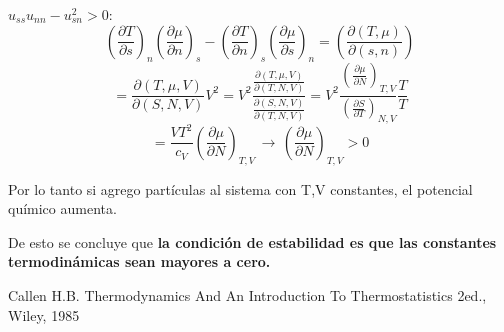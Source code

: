 \documentclass[10pt,twocolumn]{IEEEtran2e}
\begin{document}
$u_{ss} u_{nn}-u^{2}_{sn} > 0$:
\begin{equation}
 \left(\frac{\partial T}{\partial s} \right)_{n} \left(\frac{\partial \mu}{\partial n} \right)_{s} -\left(\frac{\partial T}{\partial n} \right)_{s} \left(\frac{\partial \mu}{\partial s} \right)_{n} =\left(\frac{\partial(T,\mu)}{\partial(s,n)} \right) \nonumber
\end{equation}
\begin{equation}
=\frac{\partial(T,\mu,V)}{\partial(S,N,V)} V^{2} = V^{2} \frac{\frac{\partial(T,\mu,V)}{\partial(T,N,V)}}{\frac{\partial(S,N,V)}{\partial(T,N,V)}}=V^{2}\frac{\left(\frac{\partial\mu}{\partial N} \right)_{T,V}}{\left(\frac{\partial S}{\partial T} \right)_{N,V}}\frac{T}{T} \nonumber
\end{equation}
\begin{equation}
 =\frac{VT^{2}}{c_{V}}\left(\frac{\partial \mu}{\partial N} \right)_{T,V} \, \rightarrow \, \left(\frac{\partial \mu}{\partial N} \right)_{T,V}>0
\end{equation}

Por lo tanto si agrego part\'iculas al sistema con T,V constantes, el potencial qu\'imico aumenta.


De esto se concluye que 
\textbf{la condici\'on de estabilidad es que las constantes termodin\'amicas sean mayores a cero.}





\begin{thebibliography}{1}
 Callen H.B. Thermodynamics And An Introduction To Thermostatistics 2ed., Wiley, 1985
\end{thebibliography}
\end{document}
